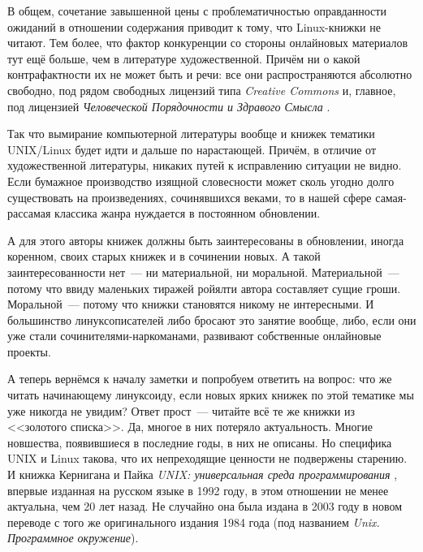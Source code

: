 В общем, сочетание завышенной цены с проблематичностью оправданности ожиданий в отношении содержания приводит к тому, что Linux-книжки не читают. Тем более, что фактор конкуренции со стороны онлайновых материалов тут ещё больше, чем в литературе художественной. Причём ни о какой контрафактности их не может быть и речи: все они распространяются абсолютно свободно, под рядом свободных лицензий типа 
\textit{Creative Commons} и, главное, под лицензией \textit{Человеческой Порядочности и Здравого Смысла}
.

Так что вымирание компьютерной литературы вообще и книжек тематики UNIX/Linux будет идти и дальше по нарастающей. Причём, в отличие от художественной литературы, никаких путей к исправлению ситуации не видно. Если бумажное производство изящной словесности может сколь угодно долго существовать на произведениях, сочинявшихся веками, то в нашей сфере самая-рассамая классика жанра нуждается в постоянном обновлении.

А для этого авторы книжек должны быть заинтересованы в обновлении, иногда коренном, своих старых книжек и в сочинении новых. А такой заинтересованности нет~--- ни материальной, ни моральной. Материальной~--- потому что ввиду маленьких тиражей ройялти автора составляет сущие гроши. Моральной~--- потому что книжки становятся никому не интересными. И большинство линуксописателей либо бросают это занятие вообще, либо, если они уже стали сочинителями-наркоманами, развивают собственные онлайновые проекты.

А теперь вернёмся к началу заметки и попробуем ответить на вопрос: что же читать начинающему линуксоиду, если новых ярких книжек по этой тематике мы уже никогда не увидим? Ответ прост~--- читайте всё те же книжки из <<золотого списка>>. Да, многое в них потеряло актуальность. Многие новшества, появившиеся в последние годы, в них не описаны. Но специфика UNIX и Linux такова, что их непреходящие ценности не подвержены старению. И книжка Кернигана и Пайка 
\textit{UNIX: универсальная среда программирования}
, впервые изданная на русском языке в 1992 году, в этом отношении не менее актуальна, чем 20 лет назад. Не случайно она была издана в 2003 году в новом переводе с того же оригинального издания 1984 года (под названием \textit{Unix. Программное окружение}).